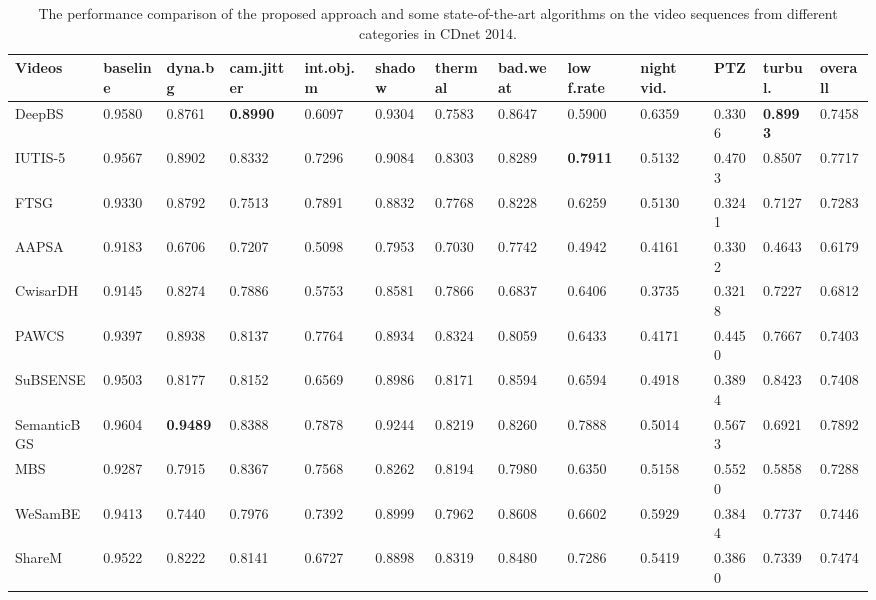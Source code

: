 \documentclass[journal]{IEEEtran}
\begin{document}
\begin{table}[!t]				%
\centering
\caption{The performance comparison of the proposed approach and some state-of-the-art algorithms on the video sequences from different categories in CDnet 2014.}
\label{tab1}
\begin{tabular}{lllllllllllll}
\hline
Videos      & baseline & dyna.bg & cam.jitter & int.obj.m & shadow & thermal & bad.weat & low f.rate & night vid. & PTZ    & turbul. & overall \\ \hline
DeepBS      & 0.9580   & 0.8761  & \textbf{0.8990}     & 0.6097    & 0.9304 & 0.7583  & 0.8647   & 0.5900     & 0.6359     & 0.3306 & \textbf{0.8993}  & 0.7458  \\
IUTIS-5     & 0.9567   & 0.8902  & 0.8332     & 0.7296    & 0.9084 & 0.8303  & 0.8289   & \textbf{0.7911}     & 0.5132     & 0.4703 & 0.8507  & 0.7717  \\
FTSG        & 0.9330   & 0.8792  & 0.7513     & 0.7891    & 0.8832 & 0.7768  & 0.8228   & 0.6259     & 0.5130     & 0.3241 & 0.7127  & 0.7283  \\
AAPSA       & 0.9183   & 0.6706  & 0.7207     & 0.5098    & 0.7953 & 0.7030  & 0.7742   & 0.4942     & 0.4161     & 0.3302 & 0.4643  & 0.6179  \\
CwisarDH    & 0.9145   & 0.8274  & 0.7886     & 0.5753    & 0.8581 & 0.7866  & 0.6837   & 0.6406     & 0.3735     & 0.3218 & 0.7227  & 0.6812  \\
PAWCS       & 0.9397   & 0.8938  & 0.8137     & 0.7764    & 0.8934 & 0.8324  & 0.8059   & 0.6433     & 0.4171     & 0.4450 & 0.7667  & 0.7403  \\
SuBSENSE    & 0.9503   & 0.8177  & 0.8152     & 0.6569    & 0.8986 & 0.8171  & 0.8594   & 0.6594     & 0.4918     & 0.3894 & 0.8423  & 0.7408  \\
SemanticBGS & 0.9604   & \textbf{0.9489}  & 0.8388     & 0.7878    & 0.9244 & 0.8219  & 0.8260   & 0.7888     & 0.5014     & 0.5673 & 0.6921  & 0.7892  \\
MBS         & 0.9287   & 0.7915  & 0.8367     & 0.7568    & 0.8262 & 0.8194  & 0.7980   & 0.6350     & 0.5158     & 0.5520 & 0.5858  & 0.7288  \\
WeSamBE     & 0.9413   & 0.7440  & 0.7976     & 0.7392    & 0.8999 & 0.7962  & 0.8608   & 0.6602     & 0.5929     & 0.3844 & 0.7737  & 0.7446  \\
ShareM      & 0.9522   & 0.8222  & 0.8141     & 0.6727    & 0.8898 & 0.8319  & 0.8480   & 0.7286     & 0.5419     & 0.3860 & 0.7339  & 0.7474  \\

\end{tabular}
\end{table}
\end{document}

